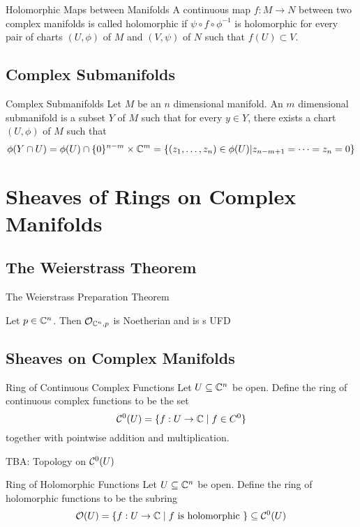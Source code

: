 \documentclass[a4paper]{article}
\begin{document}
\begin{defn}{Holomorphic Maps between Manifolds}{} A continuous map $f:M\to N$ between two complex manifolds is called holomorphic if $\psi\circ f\circ\phi^{-1}$ is holomorphic for every pair of charts $(U,\phi)$ of $M$ and $(V,\psi)$ of $N$ such that $f(U)\subset V$. 
\end{defn}

\subsection{Complex Submanifolds}
\begin{defn}{Complex Submanifolds}{} Let $M$ be an $n$ dimensional manifold. An $m$ dimensional submanifold is a subset $Y$ of $M$ such that for every $y\in Y$, there exists a chart $(U,\phi)$ of $M$ such that $$\phi(Y\cap U)=\phi(U)\cap\{0\}^{n-m}\times\mathbb{C}^m=\{(z_1,\dots,z_n)\in\phi(U)|z_{n-m+1}=\dots=z_n=0\}$$
\end{defn}

\pagebreak
\section{Sheaves of Rings on Complex Manifolds}
\subsection{The Weierstrass Theorem}
\begin{thm}{The Weierstrass Preparation Theorem}{}
\end{thm}

\begin{prp}{}{} Let $p\in\mathbb{C}^n$. Then $\mathcal{O}_{\mathbb{C}^n,p}$ is Noetherian and is s UFD
\end{prp}

\subsection{Sheaves on Complex Manifolds}
\begin{defn}{Ring of Continuous Complex Functions}{} Let $U\subseteq\mathbb{C}^n$ be open. Define the ring of continuous complex functions to be the set $$\mathcal{C}^0(U)=\{f:U\to\mathbb{C}\;|\;f\in C^0\}$$ together with pointwise addition and multiplication. 
\end{defn}

TBA: Topology on $\mathcal{C}^0(U)$

\begin{defn}{Ring of Holomorphic Functions}{} Let $U\subseteq\mathbb{C}^n$ be open. Define the ring of holomorphic functions to be the subring $$\mathcal{O}(U)=\{f:U\to\mathbb{C}\;|\;f\text{ is holomorphic }\}\subseteq\mathcal{C}^0(U)$$
\end{defn}
\end{document}
